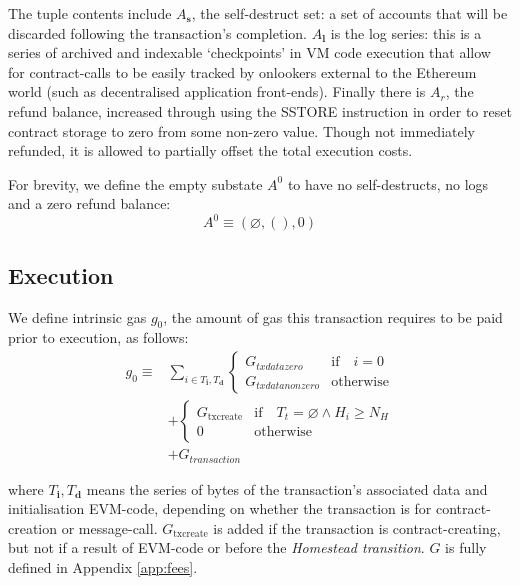 \documentclass[9pt,oneside]{amsart}
\newcommand{\firsthomesteadblock}{\ensuremath{N_H}}
\begin{document}
\begin{multicols}{2}
The tuple contents include $A_\mathbf{s}$, the self-destruct set: a set of accounts that will be discarded following the transaction's completion. $A_\mathbf{l}$ is the log series: this is a series of archived and indexable `checkpoints' in VM code execution that allow for contract-calls to be easily tracked by onlookers external to the Ethereum world (such as decentralised application front-ends). Finally there is $A_r$, the refund balance, increased through using the {\small SSTORE} instruction in order to reset contract storage to zero from some non-zero value. Though not immediately refunded, it is allowed to partially offset the total execution costs.

For brevity, we define the empty substate $A^0$ to have no self-destructs, no logs and a zero refund balance:
\begin{equation}
A^0 \equiv (\varnothing, (), 0)
\end{equation}

\subsection{Execution}
We define intrinsic gas $g_0$, the amount of gas this transaction requires to be paid prior to execution, as follows:
\begin{align}
g_0 \equiv {} & \sum_{i \in T_\mathbf{i}, T_\mathbf{d}} \begin{cases} G_{txdatazero} & \text{if} \quad i = 0 \\ G_{txdatanonzero} & \text{otherwise} \end{cases} \\
{} & + \begin{cases} G_\text{txcreate} & \text{if} \quad T_t = \varnothing \wedge H_i \geq \firsthomesteadblock \\ 0 & \text{otherwise} \end{cases} \\
{} & + G_{transaction}
\end{align}

where $T_\mathbf{i},T_\mathbf{d}$ means the series of bytes of the transaction's associated data and initialisation EVM-code, depending on whether the transaction is for contract-creation or message-call. $G_\text{txcreate}$ is added if the transaction is contract-creating, but not if a result of EVM-code or before the {\it Homestead transition}. $G$ is fully defined in Appendix \ref{app:fees}.



\end{multicols}
\end{document}
